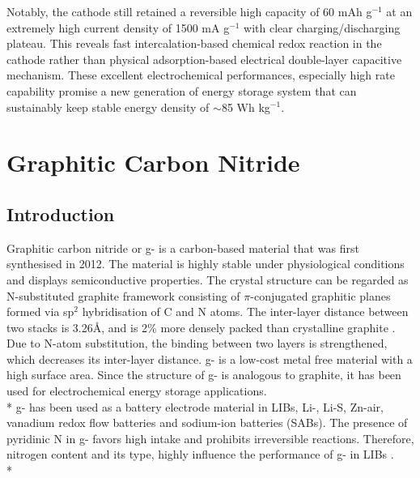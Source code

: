 Notably, the cathode still retained a reversible high capacity of 60 mAh g$^{-1}$ at an extremely high current density of 1500 mA g$^{-1}$ with clear charging/discharging plateau. This reveals fast intercalation-based chemical redox reaction in the  cathode rather than physical adsorption-based electrical double-layer capacitive mechanism. These excellent electrochemical performances, especially high rate capability promise a new generation of energy storage system that can sustainably keep stable energy density of $\sim$85 Wh kg$^{-1}$.


\section{Graphitic Carbon Nitride}

\subsection{Introduction}
Graphitic carbon nitride or g- is a carbon-based material that was first synthesised in 2012. The material is highly stable under physiological conditions and displays semiconductive properties. The crystal structure can be regarded as N-substituted graphite framework consisting of $\pi$-conjugated graphitic planes formed via sp$^2$ hybridisation of C and N atoms. The inter-layer distance between two stacks is 3.26\AA, and is 2\% more densely packed than crystalline graphite \cite{zheng_gra}. Due to N-atom substitution, the binding between two layers is strengthened, which decreases its inter-layer distance. g- is a low-cost metal free material with a high surface area. Since the structure of g- is analogous to graphite, it has been used for electrochemical energy storage applications. \\*
g- has been used as a battery electrode material in LIBs, Li-, Li-S, Zn-air, vanadium redox flow batteries and sodium-ion batteries (SABs). The presence of pyridinic N in g- favors high  intake and prohibits irreversible reactions. Therefore, nitrogen content and its type, highly influence the performance of g- in LIBs \cite{shah}. \\*
